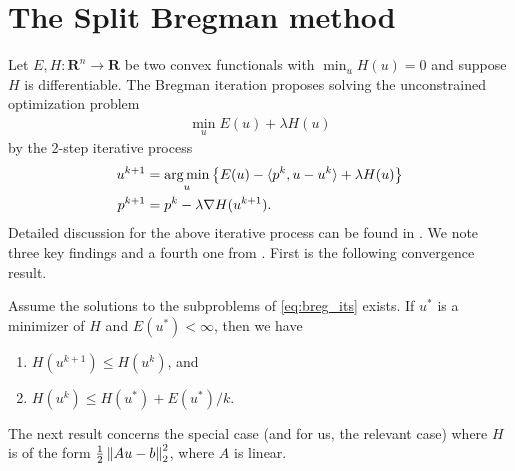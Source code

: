\chapter{The Split Bregman method}
\label{appdx:sb}
Let $E, H: \mathbf{R}^n \rightarrow \mathbf{R}$ be two convex functionals with $\min_u H(u) = 0$ and suppose $H$ is differentiable. The Bregman iteration proposes solving the unconstrained optimization problem 
\begin{align*}
\min_u E(u) + \lambda H(u)
\end{align*}
by the 2-step iterative process 
\begin{align}
\begin{split} 
u^{k+1} &= \operatorname*{arg\,min}_u \left\{ E(u) - \langle p^k, u - u^k \rangle + \lambda H(u)  \right\}
\\
p^{k+1} &= p^k - \lambda\nabla H(u^{k+1}).  
\end{split}
\label{eq:breg_its}
\end{align}
Detailed discussion for the above iterative process can be found in \cite{osher2005iterative}. We note three key findings and a fourth one from \cite{goldstein2010geometric}. First is the following convergence result.
\begin{thm}
	Assume the solutions to the subproblems of \eqref{eq:breg_its} exists. If $u^*$ is a minimizer of $H$ and $E(u^*) < \infty$, then we have 
	\begin{enumerate}
		\item $H(u^{k+1}) \leq H(u^{k})$, and 
		\item $H(u^k) \leq H(u^*)  + E(u^*) / k$.
	\end{enumerate}
\end{thm} 
The next result concerns the special case (and for us, the relevant case) where $H$ is of the form $\frac{1}{2}\left\lVert Au - b\right\rVert^2_2$, where $A$ is linear. 


